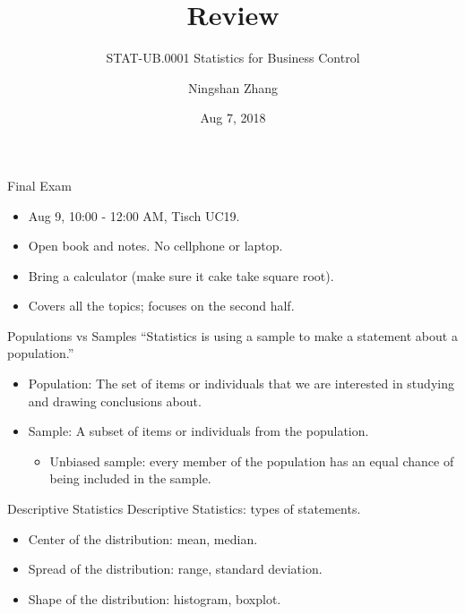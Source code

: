 \documentclass{beamer}
\title{Review}
\subtitle{STAT-UB.0001 Statistics for Business Control}
\author{Ningshan Zhang}
\institute[New York University] %
{
  IOMS Department\\
  nzhang@stern.nyu.edu
  \let\thefootnote\relax\footnotetext{\tiny{*  Office Hours: Wed \& Fri 10:00 - 11:30 AM, KMC 8-174}}
}
\date{Aug 7, 2018}
\begin{document}
\begin{frame}
  \titlepage
\end{frame}

\begin{frame}{Final Exam}
\begin{itemize}
    \item Aug 9, 10:00 - 12:00 AM, Tisch UC19.
    \item Open book and notes. No cellphone or laptop.
    \item Bring a calculator (make sure it cake take square root). 
    \item Covers all the topics; focuses on the second half.
\end{itemize}
\end{frame}


\begin{frame}{Populations vs Samples}
    ``Statistics is using a \alert{sample} to make a statement about a \alert{population}.''

        \begin{itemize}
            \item Population: The set of items or individuals that we are interested in studying and drawing conclusions about. 
            \item Sample: A subset of items or individuals from the population. 
        \begin{itemize}
            \item Unbiased sample: every member of the population has an equal chance of being included in the sample.
        \end{itemize}
        \end{itemize}
\end{frame}

\begin{frame}{Descriptive Statistics}
    Descriptive Statistics: types of statements.
    \begin{itemize}
        \item Center of the distribution: mean, median.
        \item Spread of the distribution: range, standard deviation.
        \item Shape of the distribution: histogram, boxplot.
    \end{itemize}
\end{frame}
\end{document}
